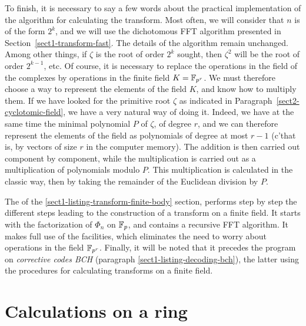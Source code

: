  
  To finish, it is necessary to say a few words about the practical implementation of the algorithm for calculating the transform. Most often, we will consider that $ n $ is of the form $ 2^k $, and we will use the dichotomous FFT algorithm presented in Section~\ref{sect1-transform-fast}. The details of the algorithm remain unchanged. Among other things, if $ \zeta $ is the root of order $ 2^k $ sought, then $ \zeta^2 $ will be the root of order $ 2^{k-1} $, etc. Of course, it is necessary to replace the operations in the field of the complexes by operations in the finite field $ K = \mathbb{F}_{p^r} $. We must therefore choose a way to represent the elements of the field $ K $, and know how to multiply them. If we have looked for the primitive root $ \zeta $ as indicated in Paragraph~\ref{sect2-cyclotomic-field}, we have a very natural way of doing it. Indeed, we have at the same time the minimal polynomial $ P $ of $ \zeta $, of degree $ r $, and we can therefore represent the elements of the field as polynomials of degree at most $ r-1 $ (c'that is, by vectors of size $ r $ in the computer memory). The addition is then carried out component by component, while the multiplication is carried out as a multiplication of polynomials modulo $ P $. This multiplication is calculated in the classic way, then by taking the remainder of the Euclidean division by $ P $.
 
 
The \listingterme{} \Maple{} of the \ref{sect1-listing-transform-finite-body} section, performs step by step the different steps leading to the construction of a transform on a finite field. It starts with the factorization of $ \Phi_n $ on $ \mathbb{F}_p $, and contains a recursive FFT algorithm. It makes full use of the \Maple{} facilities, which eliminates the need to worry about operations in the field $ \mathbb{F}_{p^r} $. Finally, it will be noted that it precedes the program on \textit{corrective codes BCH} (paragraph \ref{sect1-listing-decoding-bch}), the latter using the procedures for calculating transforms on a finite field.

\section{Calculations on a ring}
\label{sect1-calculations-ring}
 
